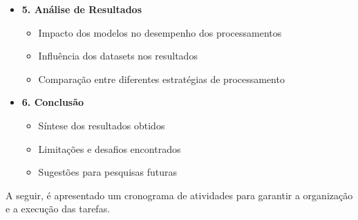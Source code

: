 \begin{itemize}
    \item \textbf{5. Análise de Resultados}
    \begin{itemize}
        \item Impacto dos modelos no desempenho dos processamentos
        \item Influência dos datasets nos resultados
        \item Comparação entre diferentes estratégias de processamento
    \end{itemize}

    \item \textbf{6. Conclusão}
    \begin{itemize}
        \item Síntese dos resultados obtidos
        \item Limitações e desafios encontrados
        \item Sugestões para pesquisas futuras
    \end{itemize}
\end{itemize}

A seguir, é apresentado um cronograma de atividades para garantir a organização e a execução das tarefas.

\renewcommand{\arraystretch}{1.5}
\begin{table}[h!]
    \centering
    \caption{Cronograma de Atividades}
    \label{tab:cronograma}
\end{table}

